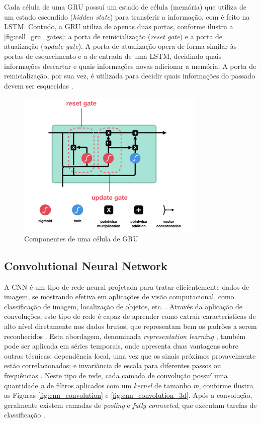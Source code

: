 Cada célula de uma GRU possuí um estado de célula (memória) que utiliza de um estado escondido (\textit{hidden state}) para transferir a informação, com é feito na LSTM. Contudo, a GRU utiliza de apenas duas portas, conforme ilustra a \autoref{fig:cell_gru_gates}: a porta de reinicialização (\textit{reset gate}) e a porta de atualização (\textit{update gate}). A porta de atualização opera de forma similar às portas de esquecimento e a de entrada de uma LSTM, decidindo quais informações descartar e quais informações novas adicionar a memória. A porta de reinicialização, por sua vez, é utilizada para decidir quais informações do passado devem ser esquecidas \cite{Phi2020}.

\begin{figure}[h]
  \centering
  \caption{Componentes de uma célula de GRU}
   \label{fig:cell_gru_gates}
   \includegraphics[width=0.8\textwidth]{figuras/fig_10.png}
\end{figure}

\subsection{Convolutional Neural Network}

A CNN é um tipo de rede neural projetada para tratar eficientemente dados de imagem, se mostrando efetiva em aplicações de visão computacional, como classificação de imagem, localização de objetos, etc. \cite{Brownlee2018}. Através da aplicação de convoluções, este tipo de rede é capaz de aprender como extrair características de alto nível diretamente nos dados brutos, que representam bem os padrões a serem reconhecidos \cite{Dixon2019,Goodfellow2016}. Esta abordagem, denominada \textit{representation learning} \cite{Brownlee2018}, também pode ser aplicada em séries temporais, onde apresenta duas vantagens sobre outras técnicas: dependência local, uma vez que os sinais próximos provavelmente estão correlacionados; e invariância de escala para diferentes passos ou frequências \cite{Wang2019}. Neste tipo de rede, cada camada de convolução possuí uma quantidade \emph{n} de filtros aplicados com um \textit{kernel} de tamanho \emph{m}, conforme ilustra as Figuras \ref{fig:cnn_convolution} e \ref{fig:cnn_convolution_3d}. Após a convolução, geralmente existem camadas de \textit{pooling} e \textit{fully connected}, que executam tarefas de classificação \cite{Wang2019}.


